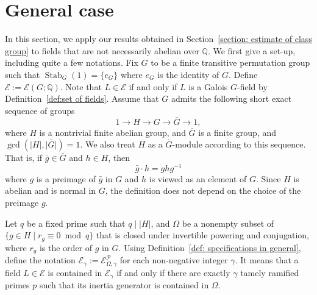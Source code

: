 \documentclass{amsart}
\numberwithin{equation}{section}
\theoremstyle{plain}
\theoremstyle{definition}
\theoremstyle{remark}
\begin{document}
\section{General case}\label{sec: general case}
In this section, we apply our results obtained in Section~\ref{section: estimate of class group} to fields that are not necessarily abelian over $\mathbb{Q}$.
We first give a set-up, including quite a few notations.
Fix $G$ to be a finite transitive permutation group such that $\operatorname{Stab}_G(1)=\{e_G\}$ where $e_G$ is the identity of $G$.
Define $\mathcal{E}:=\mathcal{E}(G;\mathbb{Q})$.
Note that $L\in\mathcal{E}$ if and only if $L$ is a Galois $G$-field by Definition~\ref{def:set of fields}.
Assume that $G$ admits the following short exact sequence of groups
\begin{equation}\label{eqn: definition of G}
	1\to H\to G\to \bar{G}\to1,
\end{equation}
where $H$ is a nontrivial finite abelian group, and $\bar{G}$ is a finite group, and $\gcd(\lvert H\rvert,\lvert\bar{G}\rvert)=1$.
We also treat $H$ as a $\bar{G}$-module according to this sequence.
That is, if $\bar{g}\in\bar{G}$ and $h\in H$, then
\begin{equation*}
	\bar{g}\cdot h=ghg^{-1}
\end{equation*}
where $g$ is a preimage of $\bar{g}$ in $G$ and $h$ is viewed as an element of $G$.
Since $H$ is abelian and is normal in $G$, the definition does not depend on the choice of the preimage $g$.

Let $q$ be a fixed prime such that $q\mid\lvert H\rvert$,
and $\Omega$ be a nonempty subset of $\{g\in H\mid r_g\equiv0\bmod{q}\}$ that is closed under invertible powering and conjugation, where $r_g$ is the order of $g$ in $G$.
Using Definition~\ref{def: specifications in general}, define the notation $\mathcal{E}_{\gamma}:=\mathcal{E}_{\Omega,\gamma}^{\mathcal{P}}$ for each non-negative integer $\gamma$.
It means that a field $L\in\mathcal{E}$ is contained in $\mathcal{E}_{\gamma}$ if and only if there are exactly $\gamma$ tamely ramified primes $p$ such that its inertia generator is contained in $\Omega$.
\end{document}

